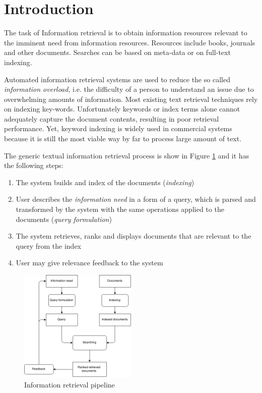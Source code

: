 \section{Introduction}

The task of Information retrieval is to obtain information resources relevant to the imminent need from information resources. Resources include books, journals and other documents. Searches can be based on meta-data or on full-text indexing.

Automated information retrieval systems are used to reduce the so called \textit{information overload}, i.e. the difficulty of a person to understand an issue due to overwhelming amounts of information. Most existing text retrieval techniques rely on indexing key-words. Unfortunately keywords or index terms alone cannot adequately capture the document contents, resulting in poor retrieval performance. Yet, keyword indexing is widely used in commercial systems because it is still the most viable way by far to process large amount of text. 

The generic textual information retrieval process is show in Figure \ref{fig:IR} and it has the following steps:
\begin{enumerate}
  \item The system builds and index of the documents (\textit{indexing}) 
  \item User describes the \textit{information need} in a form of a query, which is parsed and transformed by the system with the same operations applied to the documents (\textit{query formulation})
  \item The system retrieves, ranks and displays documents that are relevant to the query from the index
  \item User may give relevance feedback to the system
\end{enumerate}
\begin{figure}[ht]
	\centering
	\includegraphics[width=0.5\textwidth]{IR.png}
	\caption{Information retrieval pipeline \citep{hiemstra2009information}}
	\label{fig:IR}
\end{figure}
\FloatBarrier

